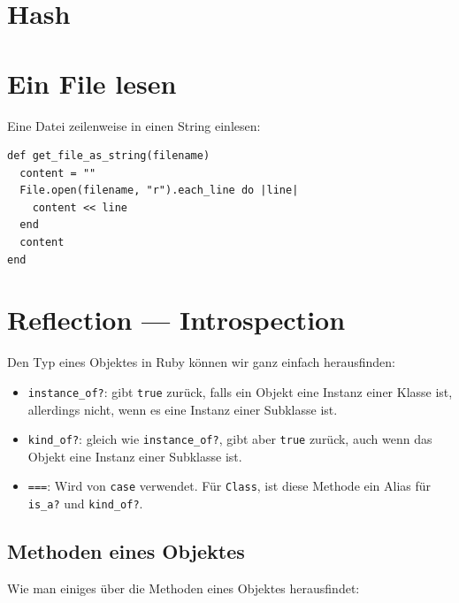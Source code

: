 \documentclass[a4book,11pt,twoside]{scrbook}
\begin{document}


\section{Hash} %
\label{sec:hash}


\newpage

\section{Ein File lesen} %
\label{sec:reading_a_file}
Eine Datei zeilenweise in einen String einlesen:
\begin{lstlisting}
def get_file_as_string(filename)
  content = ""
  File.open(filename, "r").each_line do |line|
    content << line
  end
  content
end
\end{lstlisting}





\section{Reflection — Introspection} %
\label{sec:reflection_introspection}
Den Typ eines Objektes in Ruby können wir ganz einfach herausfinden:


\begin{itemize}
	\item \texttt{instance\_of?}: gibt \texttt{true} zurück, falls ein Objekt eine Instanz einer Klasse ist, allerdings nicht, wenn es eine Instanz einer Subklasse ist.
	\item \texttt{kind\_of?}: gleich wie \texttt{instance\_of?}, gibt aber \texttt{true} zurück, auch wenn das Objekt eine Instanz einer Subklasse ist.
	\item \texttt{===}: Wird von \texttt{case} verwendet. Für \texttt{Class}, ist diese Methode ein Alias für \texttt{is\_a?} und \texttt{kind\_of?}.
\end{itemize}

\newpage

\subsection*{Methoden eines Objektes} %
\label{sub:methoden_eines_objektes}
Wie man einiges über die Methoden eines Objektes herausfindet:
\end{document}
